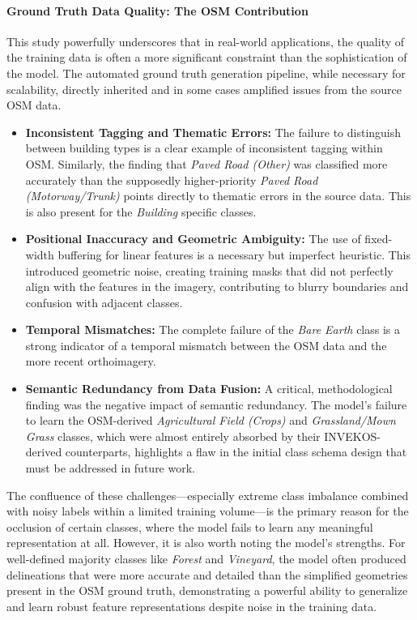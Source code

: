 \documentclass{report}
\begin{document}
\paragraph{Ground Truth Data Quality: The OSM Contribution} This study powerfully underscores that in real-world applications, the quality of the training data is often a more significant constraint than the sophistication of the model. The automated ground truth generation pipeline, while necessary for scalability, directly inherited and in some cases amplified issues from the source OSM data.
\begin{itemize}
\item \textbf{Inconsistent Tagging and Thematic Errors:} The failure to distinguish between building types is a clear example of inconsistent tagging within OSM. Similarly, the finding that \textit{Paved Road (Other)} was classified more accurately than the supposedly higher-priority \textit{Paved Road (Motorway/Trunk)} points directly to thematic errors in the source data. This is also present for the \textit{Building} specific classes.
\item \textbf{Positional Inaccuracy and Geometric Ambiguity:} The use of fixed-width buffering for linear features is a necessary but imperfect heuristic. This introduced geometric noise, creating training masks that did not perfectly align with the features in the imagery, contributing to blurry boundaries and confusion with adjacent classes.
\item \textbf{Temporal Mismatches:} The complete failure of the \textit{Bare Earth} class is a strong indicator of a temporal mismatch between the OSM data and the more recent orthoimagery.
\item \textbf{Semantic Redundancy from Data Fusion:} A critical, methodological finding was the negative impact of semantic redundancy. The model’s failure to learn the OSM-derived \textit{Agricultural Field (Crops)} and \textit{Grassland/Mown Grass} classes, which were almost entirely absorbed by their INVEKOS-derived counterparts, highlights a flaw in the initial class schema design that must be addressed in future work.
\end{itemize}
The confluence of these challenges—especially extreme class imbalance combined with noisy labels within a limited training volume—is the primary reason for the occlusion of certain classes, where the model fails to learn any meaningful representation at all. However, it is also worth noting the model's strengths. For well-defined majority classes like \textit{Forest} and \textit{Vineyard}, the model often produced delineations that were more accurate and detailed than the simplified geometries present in the OSM ground truth, demonstrating a powerful ability to generalize and learn robust feature representations despite noise in the training data.
\end{document}

